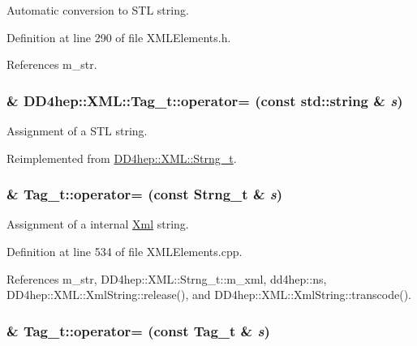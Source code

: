 Automatic conversion to STL string. 

Definition at line 290 of file XMLElements.h.

References m\_\-str.\hypertarget{class_d_d4hep_1_1_x_m_l_1_1_tag__t_aba04bd331a49bea4bdc163fe36522e84}{
\subsubsection[{operator=}]{\& DD4hep::XML::Tag\_\-t::operator= (const std::string \& {\em s})}}
\label{class_d_d4hep_1_1_x_m_l_1_1_tag__t_aba04bd331a49bea4bdc163fe36522e84}


Assignment of a STL string. 

Reimplemented from \hyperlink{class_d_d4hep_1_1_x_m_l_1_1_strng__t_ae37ccdb03f29e5e501bb050778efa386}{DD4hep::XML::Strng\_\-t}.\hypertarget{class_d_d4hep_1_1_x_m_l_1_1_tag__t_af2111caa12315241c91c1414566aad0b}{
\subsubsection[{operator=}]{ \& Tag\_\-t::operator= (const {\bf Strng\_\-t} \& {\em s})}}
\label{class_d_d4hep_1_1_x_m_l_1_1_tag__t_af2111caa12315241c91c1414566aad0b}


Assignment of a internal \hyperlink{union_xml}{Xml} string. 

Definition at line 534 of file XMLElements.cpp.

References m\_\-str, DD4hep::XML::Strng\_\-t::m\_\-xml, dd4hep::ns, DD4hep::XML::XmlString::release(), and DD4hep::XML::XmlString::transcode().\hypertarget{class_d_d4hep_1_1_x_m_l_1_1_tag__t_a1869e32e13504b08283ca87cfc1ad82a}{
\subsubsection[{operator=}]{ \& Tag\_\-t::operator= (const {\bf Tag\_\-t} \& {\em s})}}
\label{class_d_d4hep_1_1_x_m_l_1_1_tag__t_a1869e32e13504b08283ca87cfc1ad82a}


